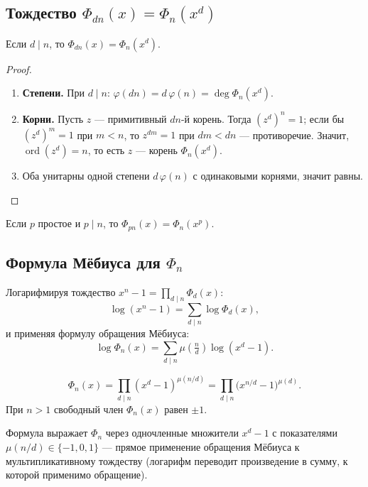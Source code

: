 \subsection{Тождество $\Phi_{dn}(x)=\Phi_n(x^d)$}

\begin{Statement}{}{}
	Если $d\mid n$, то $\Phi_{dn}(x)=\Phi_n(x^d)$.
\end{Statement}

\begin{proof}
	\begin{enumerate}
		\item \textbf{Степени.} При $d\mid n$: $\varphi(dn)=d\,\varphi(n)=\deg\Phi_n(x^d)$.
		\item \textbf{Корни.} Пусть $z$ — примитивный $dn$-й корень. Тогда $(z^d)^n=1$; если бы $(z^d)^m=1$ при $m<n$, то $z^{dm}=1$ при $dm<dn$ — противоречие. Значит, $\operatorname{ord}(z^d)=n$, то есть $z$ — корень $\Phi_n(x^d)$.
		\item Оба унитарны одной степени $d\,\varphi(n)$ с одинаковыми корнями, значит равны.
	\end{enumerate}
\end{proof}

\begin{Corollary}{}{}
	Если $p$ простое и $p\mid n$, то $\Phi_{pn}(x)=\Phi_n(x^p)$.
\end{Corollary}

\subsection{Формула Мёбиуса для $\Phi_n$}

Логарифмируя тождество $x^n-1=\prod_{d\mid n}\Phi_d(x)$:
\[
\log(x^n-1)=\sum_{d\mid n}\log\Phi_d(x),
\]
и применяя формулу обращения Мёбиуса:
\[
\log\Phi_n(x)=\sum_{d\mid n}\mu\!\left(\tfrac{n}{d}\right)\log(x^d-1).
\]

\begin{Statement}{}{}
	\[
	\Phi_n(x)=\prod_{d\mid n}(x^d-1)^{\mu(n/d)}=\prod_{d\mid n}\bigl(x^{n/d}-1\bigr)^{\mu(d)}.
	\]
	При $n>1$ свободный член $\Phi_n(x)$ равен $\pm 1$.
\end{Statement}

\begin{Remark}{}{}
	Формула выражает $\Phi_n$ через одночленные множители $x^d-1$ с показателями $\mu(n/d)\in\{-1,0,1\}$ — прямое применение обращения Мёбиуса к мультипликативному тождеству (логарифм переводит произведение в сумму, к которой применимо обращение).
\end{Remark}
